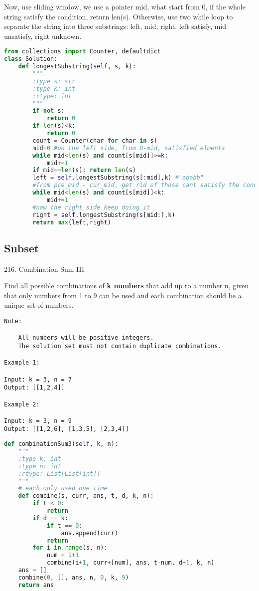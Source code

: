 \documentclass[../main.tex]{subfiles}
\begin{document}
\begin{enumerate}
Now, use sliding window, we use a pointer mid, what start from 0, if the whole string satisfy the condition, return len(s). Otherwise, use two while loop to separate the string into three substrings: left, mid, right. left satisfy, mid unsatisfy, right unknown.
\begin{lstlisting}[language = Python]
from collections import Counter, defaultdict
class Solution:
    def longestSubstring(self, s, k):
        """
        :type s: str
        :type k: int
        :rtype: int
        """
        if not s:
            return 0
        if len(s)<k:
            return 0
        count = Counter(char for char in s)
        mid=0 #on the left side, from 0-mid, satisfied elments
        while mid<len(s) and count[s[mid]]>=k:
            mid+=1
        if mid==len(s): return len(s) 
        left = self.longestSubstring(s[:mid],k) #"ababb"
        #from pre_mid - cur_mid, get rid of those cant satisfy the condition
        while mid<len(s) and count[s[mid]]<k:
            mid+=1
        #now the right side keep doing it
        right = self.longestSubstring(s[mid:],k)
        return max(left,right)
\end{lstlisting}
\end{enumerate}

\subsection{Subset}
\label{sec_array_subset}


216. Combination Sum III


Find all possible combinations of \textbf{k numbers} that add up to a number n, given that only numbers from 1 to 9 can be used and each combination should be a unique set of numbers.
\begin{lstlisting}[numbers=none]
Note:

    All numbers will be positive integers.
    The solution set must not contain duplicate combinations.

Example 1:

Input: k = 3, n = 7
Output: [[1,2,4]]

Example 2:

Input: k = 3, n = 9
Output: [[1,2,6], [1,3,5], [2,3,4]]
\end{lstlisting}
\begin{lstlisting}[language=Python]
def combinationSum3(self, k, n):
    """
    :type k: int
    :type n: int
    :rtype: List[List[int]]
    """
    # each only used one time
    def combine(s, curr, ans, t, d, k, n):
        if t < 0:
            return
        if d == k:
            if t == 0:
                ans.append(curr)
            return
        for i in range(s, n):
            num = i+1
            combine(i+1, curr+[num], ans, t-num, d+1, k, n)
    ans = []
    combine(0, [], ans, n, 0, k, 9)
    return ans
\end{lstlisting}
\end{document}
